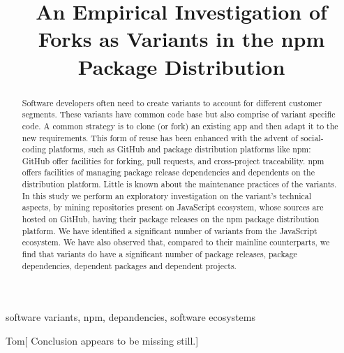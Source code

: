 \documentclass[conference]{IEEEtran}
\newcommand{\tm}[1]{{\textsf{Tom}[\smaller\sffamily\color{red} #1}]}
\newcommand{\gh}{\textsf{GitHub}\xspace}
\newcommand{\np}{\textsf{npm}\xspace}
\newcommand{\js}{\textsf{JavaScript}\xspace}
\newcommand{\npm}{{the \np package distribution platform}\xspace}
\begin{document}
\title{An Empirical Investigation of Forks as Variants in the npm Package Distribution}


\author{
	}



\maketitle

\begin{abstract}
Software developers often need to create variants to account for different customer segments. These variants have common code base but also comprise of variant specific code. A common strategy is to clone (or fork) an existing app and then adapt it to the new requirements. This form of reuse has been enhanced with the advent of social-coding platforms, such as \gh and package distribution platforms like \np: \gh offer facilities for forking, pull requests, and cross-project traceability. \np offers facilities of managing package release dependencies and dependents on the distribution platform. Little is known about the maintenance practices of the variants.
In this study we perform an exploratory investigation on the variant's technical aspects, by mining repositories present on \js ecosystem, whose sources are hosted on \gh, having their package releases on \npm. We have identified a significant number of variants from the \js ecosystem. We have also observed that, compared to their mainline counterparts, we find that variants do have a significant number of package releases, package dependencies, dependent packages and dependent projects.

\end{abstract}

\begin{IEEEkeywords}
software variants, npm, depandencies, software ecosystems
\end{IEEEkeywords}









\tm{Conclusion appears to be missing still.}




\end{document}
